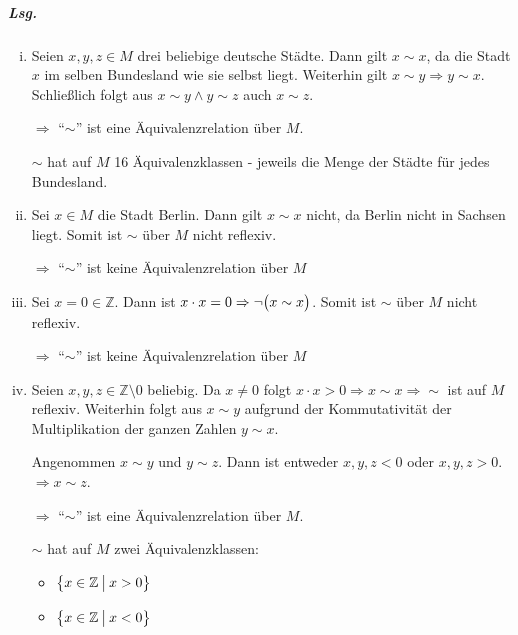 \documentclass{scrreprt}
\begin{document}
\subparagraph{Lsg.}
\begin{enumerate}[(i)]
\item Seien $x, y, z \in M$ drei beliebige deutsche Städte.
  Dann gilt $x \sim x$, da die Stadt $x$ im selben Bundesland wie sie selbst
  liegt.
  Weiterhin gilt $x \sim y \Rightarrow y \sim x$.
  Schließlich folgt aus $x \sim y \land y \sim z$ auch $x \sim z$.

  $\Rightarrow$ ``$\sim$'' ist eine Äquivalenzrelation über $M$.

  $\sim$ hat auf $M$ 16 Äquivalenzklassen - jeweils die Menge der Städte für
  jedes Bundesland.

\item Sei $x \in M$ die Stadt Berlin.
  Dann gilt $x \sim x$ nicht, da Berlin nicht in Sachsen liegt.
  Somit ist $\sim$ über $M$ nicht reflexiv.

  $\Rightarrow$ ``$\sim$'' ist keine Äquivalenzrelation über $M$

\item Sei $x = 0 \in \mathbb{Z}$.
  Dann ist $x \cdot x = 0 \Rightarrow \neg \qty\big(x \sim x)$.
  Somit ist $\sim$ über $M$ nicht reflexiv.

  $\Rightarrow$ ``$\sim$'' ist keine Äquivalenzrelation über $M$

\item Seien $x, y, z \in \mathbb{Z} \setminus \qty{0}$ beliebig.
  Da $x \ne 0$ folgt $x \cdot x > 0 \Rightarrow x \sim x \Rightarrow \sim$
  ist auf $M$ reflexiv.
  Weiterhin folgt aus $x \sim y$ aufgrund der Kommutativität der Multiplikation
  der ganzen Zahlen $y \sim x$.

  Angenommen $x \sim y$ und $y \sim z$.
  Dann ist entweder $x, y, z < 0$ oder $x, y, z > 0$.
  $\Rightarrow x \sim z$.

  $\Rightarrow$ ``$\sim$'' ist eine Äquivalenzrelation über $M$.

  $\sim$ hat auf $M$ zwei Äquivalenzklassen:
  \begin{itemize}
  \item $\qty\big{x \in \mathbb{Z} \: {\big |} \: x > 0}$
  \item $\qty\big{x \in \mathbb{Z} \: {\big |} \: x < 0}$
  \end{itemize}
\end{enumerate}
\end{document}
